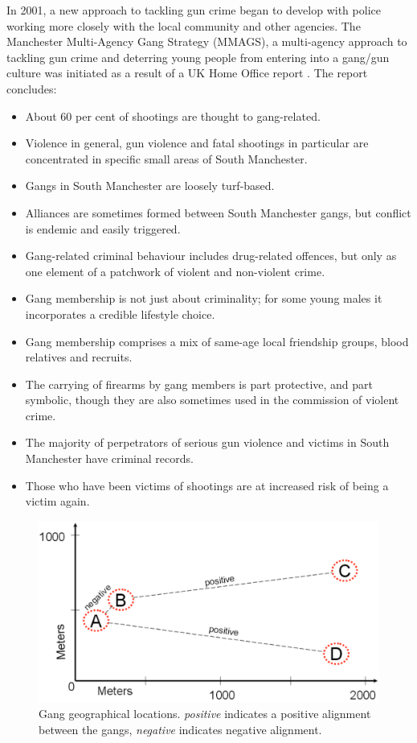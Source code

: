 \documentclass[twocolumn]{svjour3}          %
\theoremstyle{definition}
\begin{document}
In 2001, a new approach to tackling gun crime began to develop with
police working more closely with the local community and other
agencies. The Manchester Multi-Agency Gang Strategy (MMAGS), a
multi-agency approach to tackling gun crime and deterring young people
from entering into a gang/gun culture was initiated as a result of a
UK Home Office report \citep{BullockTilley2002}. The report concludes:

\begin{itemize}
\item About 60 per cent of shootings are thought to gang-related.
\item Violence in general, gun violence and fatal shootings in
particular are concentrated in specific small areas of South
Manchester.
\item Gangs in South Manchester are loosely turf-based.
\item Alliances are sometimes formed between South Manchester gangs,
but conflict is endemic and easily triggered.
\item Gang-related criminal behaviour includes drug-related offences,
but only as one element of a patchwork of violent and non-violent
crime.
\item Gang membership is not just about criminality; for some young
males it incorporates a credible lifestyle choice.
\item Gang membership comprises a mix of same-age local friendship
groups, blood relatives and recruits.
\item The carrying of firearms by gang members is part protective, and
part symbolic, though they are also sometimes used in the commission
of violent crime.
\item The majority of perpetrators of serious gun violence and victims
in South Manchester have criminal records.
\item Those who have been victims of shootings are at increased risk
of being a victim again.
\end{itemize}

\begin{figure}[!ht]
\centering
\includegraphics[width=\columnwidth]{images/positive}
\caption{Gang geographical locations. \emph{positive} indicates a positive alignment between the gangs, \emph{negative} indicates negative alignment.}
\label{fig:positive} 
\end{figure}
\end{document}
